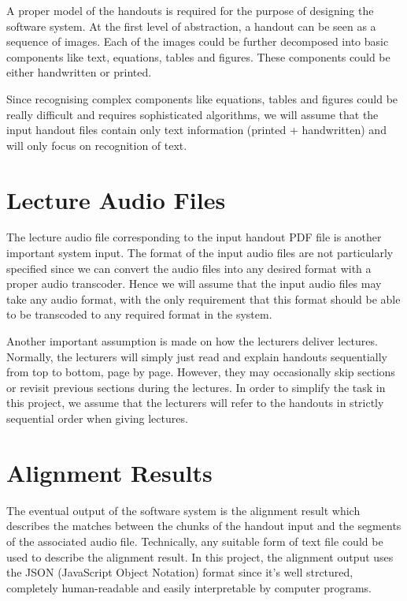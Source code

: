 A proper model of the handouts is required for the purpose of designing the software system. At the first level of abstraction, a handout can be seen as a sequence of images. Each of the images could be further decomposed into basic components like text, equations, tables and figures. These components could be either handwritten or printed.

Since recognising complex components like equations, tables and figures could be really difficult and requires sophisticated algorithms, we will assume that the input handout files contain only text information (printed + handwritten) and will only focus on recognition of text.


\section{Lecture Audio Files}

The lecture audio file corresponding to the input handout PDF file is another important system input. The format of the input audio files are not particularly specified since we can convert the audio files into any desired format with a proper audio transcoder. Hence we will assume that the input audio files may take any audio format, with the only requirement that this format should be able to be transcoded to any required format in the system.

Another important assumption is made on how the lecturers deliver lectures. Normally, the lecturers will simply just read and explain handouts sequentially from top to bottom, page by page. However, they may occasionally skip sections or revisit previous sections during the lectures. In order to simplify the task in this project, we assume that the lecturers will refer to the handouts in strictly sequential order when giving lectures.


\section{Alignment Results}
\label{sec:assume-align-res}

The eventual output of the software system is the alignment result which describes the matches between the chunks of the handout input and the segments of the associated audio file. Technically, any suitable form of text file could be used to describe the alignment result. In this project, the alignment output uses the JSON (JavaScript Object Notation) format since it's well strctured, completely human-readable and easily interpretable by computer programs.

